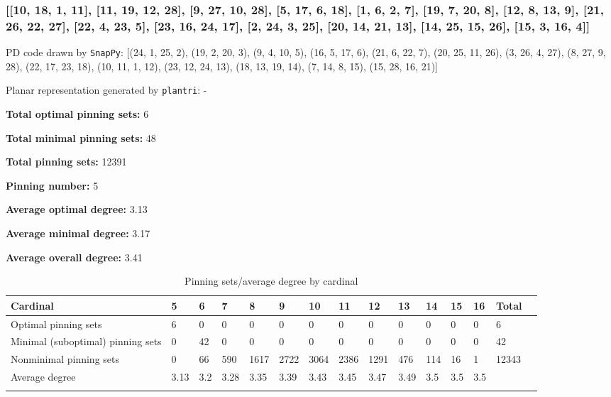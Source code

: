 \documentclass{article}%
\begin{document}
\newpage

\subsubsection{[[10, 18, 1, 11], [11, 19, 12, 28], [9, 27, 10, 28], [5, 17, 6, 18], [1, 6, 2, 7], [19, 7, 20, 8], [12, 8, 13, 9], [21, 26, 22, 27], [22, 4, 23, 5], [23, 16, 24, 17], [2, 24, 3, 25], [20, 14, 21, 13], [14, 25, 15, 26], [15, 3, 16, 4]]}

{\small\noindent PD code drawn by \texttt{SnapPy}: [(24, 1, 25, 2), (19, 2, 20, 3), (9, 4, 10, 5), (16, 5, 17, 6), (21, 6, 22, 7), (20, 25, 11, 26), (3, 26, 4, 27), (8, 27, 9, 28), (22, 17, 23, 18), (10, 11, 1, 12), (23, 12, 24, 13), (18, 13, 19, 14), (7, 14, 8, 15), (15, 28, 16, 21)]}

{\small\noindent Planar representation generated by \texttt{plantri}: -}

\begin{multicols}{2}
{\normalsize \noindent\textbf{Total optimal pinning sets:} 6

\noindent\textbf{Total minimal pinning sets:} 48

\noindent\textbf{Total pinning sets:} 12391

\noindent\textbf{Pinning number:} 5

}
\columnbreak

{\normalsize \noindent\textbf{Average optimal degree:} 3.13

\noindent\textbf{Average minimal degree:} 3.17

\noindent\textbf{Average overall degree:} 3.41

}
\end{multicols}

\begin{table}[ht]
	\caption{Pinning sets/average degree by cardinal}
	\centering
	\renewcommand{\arraystretch}{1.5}
	\begin{tabularx}{\textwidth}{lXXXXXXXXXXXXXX}
		\toprule
			Cardinal & 5 & 6 & 7 & 8 & 9 & 10 & 11 & 12 & 13 & 14 & 15 & 16 & Total\\
			\hline
			Optimal pinning sets & 6 & 0 & 0 & 0 & 0 & 0 & 0 & 0 & 0 & 0 & 0 & 0 & 6 \\
			Minimal (suboptimal) pinning sets & 0 & 42 & 0 & 0 & 0 & 0 & 0 & 0 & 0 & 0 & 0 & 0 & 42 \\
			Nonminimal pinning sets & 0 & 66 & 590 & 1617 & 2722 & 3064 & 2386 & 1291 & 476 & 114 & 16 & 1 & 12343 \\
			Average degree & 3.13 & 3.2 & 3.28 & 3.35 & 3.39 & 3.43 & 3.45 & 3.47 & 3.49 & 3.5 & 3.5 & 3.5 &  \\
		\bottomrule \\ 
	\end{tabularx}
\end{table}
\end{document}
